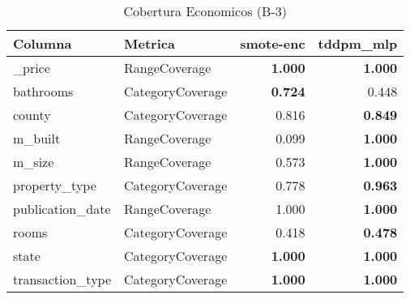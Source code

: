 \begin{table}[H]
\centering
\caption{Cobertura Economicos (B-3)}
\label{table-coverage-economicos-b-3}
\begin{tabular}{|l|l|r|r|}
\hline
\rowcolor[gray]{0.8}
Columna & Metrica & smote-enc & tddpm\_mlp \\
\hline \_price & RangeCoverage & \bfseries 1.000 & \bfseries 1.000 \\
\hline bathrooms & CategoryCoverage & \bfseries 0.724 & 0.448 \\
\hline county & CategoryCoverage & 0.816 & \bfseries 0.849 \\
\hline m\_built & RangeCoverage & 0.099 & \bfseries 1.000 \\
\hline m\_size & RangeCoverage & 0.573 & \bfseries 1.000 \\
\hline property\_type & CategoryCoverage & 0.778 & \bfseries 0.963 \\
\hline publication\_date & RangeCoverage & 1.000 & \bfseries 1.000 \\
\hline rooms & CategoryCoverage & 0.418 & \bfseries 0.478 \\
\hline state & CategoryCoverage & \bfseries 1.000 & \bfseries 1.000 \\
\hline transaction\_type & CategoryCoverage & \bfseries 1.000 & \bfseries 1.000 \\
\hline
\end{tabular}
\end{table}
